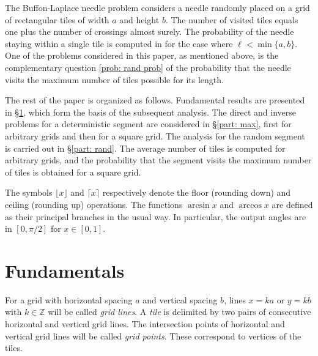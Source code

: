 \documentclass[12pt, a4paper]{article}
\newcommand{\len}{\ell} %
\begin{document}
The Buffon-Laplace needle problem \cite[section 1.1]{Mathai99} considers a needle randomly placed on a grid of rectangular tiles of width $a$ and height $b$. The number of visited tiles equals one plus the number of crossings almost surely. The probability of the needle staying within a single tile is computed in \cite{Arnow94} for the case where $\len < \min\{a,b\}$. One of the problems considered in this paper, as mentioned above, is the complementary question \ref{prob: rand prob} of the probability that the needle visits the maximum number of tiles possible for its length.

The rest of the paper is organized as follows. Fundamental results are presented in \S\ref{part: fund results}, which form the basis of the subsequent analysis. The direct and inverse problems for a deterministic segment are considered in \S\ref{part: max}, first for arbitrary grids and then for a square grid. The analysis for the random segment is carried out in \S\ref{part: rand}. The average number of tiles is computed for arbitrary grids, and the probability that the segment visits the maximum number of tiles is obtained for a square grid.

The symbols $\lfloor x \rfloor$ and $\lceil x \rceil$ respectively denote the floor (rounding down) and ceiling (rounding up) operations. The functions $\arcsin x$ and $\arccos x$ are defined as their principal branches in the usual way. In particular, the output angles are in $[0, \pi/2]$ for $x \in [0,1]$.


\section{Fundamentals}
\label{part: fund results}

For a grid with horizontal spacing $a$ and vertical spacing $b$, lines $x = ka$ or $y = kb$ with $k \in \mathbb Z$ will be called \emph{grid lines}. A \emph{tile} is delimited by two pairs of consecutive horizontal and vertical grid lines. The intersection points of horizontal and vertical grid lines will be called \emph{grid points}. These correspond to vertices of the tiles.
\end{document}
